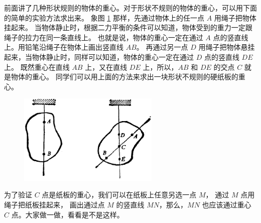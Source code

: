 
前面讲了几种形状规则的物体的重心。对于形状不规则的物体的重心，可以用下面的简单的实验方法求出来。
象图 \ref{fig:2-21} 那样，先通过物体上的任一点 $A$ 用绳子把物体挂起来。
当物体静止时，根据二力平衡的条件可以知道，物体受到的重力一定跟绳子的拉力在同一条直线上。
也就是说，物体的重心一定在通过 $A$ 点的竖直线上。用铅笔沿绳子在物体上画出竖直线 $AB$。
再通过另一点 $D$ 用绳子把物体悬挂起来，当物体静止时，同样可以知道，物体的重心一定在通过 $D$ 点的竖直线 $DE$ 上。
既然重心在直线 $AB$ 上，又在直线 $DE$ 上，所以，$AB$ 和 $DE$ 的交点 $C$ 就是物体的重心。
同学们可以用上面的方法来求出一块形状不规则的硬纸板的重心。

\begin{figure}[htbp]
    \centering
    \includegraphics[width=0.6\textwidth]{../pic/czwl1-ch2-21}
    \caption{}\label{fig:2-21}
\end{figure}

为了验证 $C$ 点是纸板的重心，我们可以在纸板上任意另选一点 $M$， 通过 $M$ 点用绳子把纸板挂起来，
画出通过点 $M$ 的竖直线 $MN$，那么，$MN$ 也应该通过重心 $C$ 点。大家做一做，看看是不是这样。







